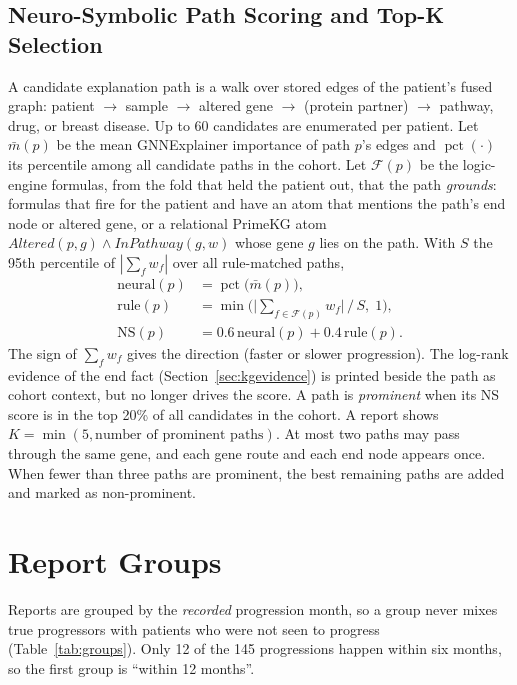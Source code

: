 \documentclass{mnnit}
\begin{document}
\subsection{Neuro-Symbolic Path Scoring and Top-K Selection}
A candidate explanation path is a walk over stored edges of the patient's fused graph:
patient $\rightarrow$ sample $\rightarrow$ altered gene $\rightarrow$ (protein partner) $\rightarrow$ pathway,
drug, or breast disease. Up to 60 candidates are enumerated per patient. Let $\bar{m}(p)$ be the mean
GNNExplainer importance of path $p$'s edges and $\operatorname{pct}(\cdot)$ its percentile among all candidate paths
in the cohort. Let $\mathcal{F}(p)$ be the logic-engine formulas, from the fold that held the patient out, that the
path \emph{grounds}: formulas that fire for the patient and have an atom that mentions the path's end node or
altered gene, or a relational PrimeKG atom $\mathit{Altered}(p,g) \wedge \mathit{InPathway}(g,w)$ whose gene $g$
lies on the path. With $S$ the 95th percentile of $|\sum_{f} w_f|$ over all rule-matched paths,
\begin{align}
  \text{neural}(p) &= \operatorname{pct}\big(\bar{m}(p)\big),\\
  \text{rule}(p) &= \min\!\Big(\big|\textstyle\sum_{f \in \mathcal{F}(p)} w_f\big| \,/\, S,\; 1\Big),\\
  \text{NS}(p) &= 0.6\,\text{neural}(p) + 0.4\,\text{rule}(p).
\end{align}
The sign of $\sum_f w_f$ gives the direction (faster or slower progression). The log-rank evidence of the end fact
(Section~\ref{sec:kgevidence}) is printed beside the path as cohort context, but no longer drives the score.
A path is \emph{prominent} when its NS score is in the top 20\% of all candidates in the cohort. A report shows
$K = \min(5, \text{number of prominent paths})$. At most two paths may pass through the same gene, and each gene
route and each end node appears once. When fewer than three paths are prominent, the best remaining paths are
added and marked as non-prominent.

\section{Report Groups}
Reports are grouped by the \emph{recorded} progression month, so a group never mixes true progressors with
patients who were not seen to progress (Table~\ref{tab:groups}). Only 12 of the 145 progressions happen within
six months, so the first group is ``within 12 months''.
\end{document}
